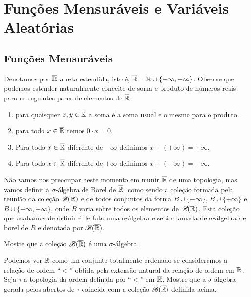 \chapter[Aula 5]{Funções Mensuráveis e Variáveis Aleatórias}
\chaptermark{}

\section{Funções Mensuráveis}

Denotamos por $\overline{\mathbb{R}}$ a reta estendida, isto é, 
$\overline{\mathbb{R}} = \mathbb{R}\cup\{-\infty,+\infty\}$. 
Observe que podemos estender naturalmente conceito 
de soma e produto  de números reais
para os seguintes pares de elementos 
de $\overline{\mathbb{R}}$:
\begin{enumerate}
	\item 
	para quaisquer $x,y\in \mathbb{R}$ a soma é a soma usual 
	e o mesmo para o produto. 
	
	\item para todo $x\in \overline{\mathbb{R}}$ temos 
	$0\cdot x=0$.
	
	\item Para todo $x\in \overline{\mathbb{R}}$ diferente de 
	$-\infty$ definimos $x+(+\infty)=+\infty$.

	\item Para todo $x\in \overline{\mathbb{R}}$ diferente de 
	$+\infty$ definimos $x+(-\infty)=-\infty$.
\end{enumerate}

Não vamos nos preocupar neste momento em munir $\overline{\mathbb{R}}$ 
de uma topologia, mas vamos definir a $\sigma$-álgebra
de Borel de $\overline{\mathbb{R}}$,
como sendo a coleção formada pela reunião da
coleção $\mathscr{B}(\mathbb{R})$ 
e de todos conjuntos da forma 
$B\cup\{-\infty\}$, $B\cup\{+\infty\}$ e $B\cup\{-\infty,+\infty\}$,
onde $B$ varia sobre todos os elementos de $\mathscr{B}(\mathbb{R})$.
Esta coleção que acabamos de definir
é de fato uma $\sigma$-álgebra e será chamada de $\sigma$-álgebra
de borel de $\overline{R}$ e denotada por $\mathscr{B}(\overline{\mathbb{R}})$.

\begin{exercicio}
	Mostre que a coleção $\mathscr{B}(\overline{\mathbb{R}})$ 
	é uma $\sigma$-álgebra.
\end{exercicio}

\begin{exercicio}
	Podemos ver $\overline{\mathbb{R}}$ como um conjunto totalmente ordenado se 
	consideramos a relação de ordem ``$<$'' obtida pela extensão natural 
	da relação de ordem em $\mathbb{R}$.
	Seja $\tau$ a topologia da ordem definida por ``$<$'' 
	em $\overline{\mathbb{R}}$. Mostre que a $\sigma$-álgebra gerada pelos 
	abertos de $\tau$ coincide com a coleção $\mathscr{B}(\overline{\mathbb{R}})$
	definida acima. 
	
\end{exercicio}










